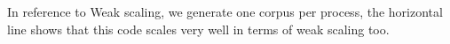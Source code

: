 \documentclass[11pt,a4paper]{article}
\begin{document}
In reference to Weak scaling, we generate one corpus per process, the horizontal line shows that this code scales very well  in terms of weak scaling too.




















































































\end{document}
